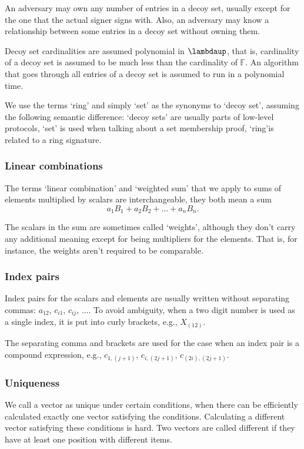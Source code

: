 \documentclass{mathcryptology} %
\theoremstyle{title}
\theoremstyle{titleof}
\begin{document}
    An adversary may own any number of entries in a decoy set, usually except for the one that the actual signer signs with. Also, an adversary may know a relationship between some entries in a decoy set without owning them.

    Decoy set cardinalities are assumed polynomial in $\bm{\lambdaup}$, that is, cardinality of a decoy set is assumed to be much less than the cardinality of $\mathds{F}$. An algorithm that goes through all entries of a decoy set is assumed to run in a polynomial time.

    We use the terms `ring' and simply `set' as the synonyms to `decoy set', assuming the following semantic difference: `decoy sets' are usually parts of low-level protocols, `set' is used when talking about a set membership proof, `ring'is related to a ring signature.


\subsubsection{Linear combinations}
    The terms `linear combination' and `weighted sum' that we apply to sums of elements multiplied by scalars are interchangeable, they both mean a sum
    \begin{equation*}
        a_{1} B_{1} + a_{2} B_{2} + {\dots} + a_{n} B_{n}.
    \end{equation*}

    The scalars in the sum are sometimes called `weights', although they don't carry any additional meaning except for being multipliers for the elements. That is, for instance, the weights aren't required to be comparable.

\subsubsection{Index pairs}
Index pairs for the scalars and elements are usually written without separating commas: $a_{12}$, $c_{i1}$, $c_{ij}$, ${\dots}$. 
To avoid ambiguity, when a two digit number is used as a single index, it is put into curly brackets, e.g., $X_{(12)}$. 

The separating comma and brackets are used for the case when an index pair is a compound expression, e.g., $c_{1,(j+1)}$, $c_{i,(2j+1)}$, $c_{(2i),(2j+1)}$.

\subsubsection{Uniqueness}
    We call a vector as unique under certain conditions, when there can be efficiently calculated exactly one vector satisfying the conditions. Calculating a different vector satisfying these conditions is hard. Two vectors are called different if they have at least one position with different items.
    
\end{document}
